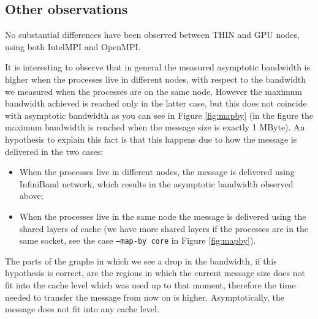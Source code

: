 \documentclass{article}
\begin{document}
\subsection{Other observations}

No substantial differences have been observed between THIN and GPU nodes, using both IntelMPI and OpenMPI.

It is interesting to observe that in general the measured asymptotic bandwidth is higher when the processes live in different nodes, with respect to the bandwidth we measured when the processes are on the same node. However the maximum bandwidth achieved is reached only in the latter case, but this does not coincide with asymptotic bandwidth as you can see in Figure \ref{fig:mapby} (in the figure the maximum bandwidth is reached when the message size is exactly 1 MByte). An hypothesis to explain this fact is that this happens due to how the message is delivered in the two cases:
\begin{itemize}
    \item When the processes live in different nodes, the message is delivered using InfiniBand network, which results in the asymptotic bandwidth observed above;
    \item When the processes live in the same node the message is delivered using the shared layers of cache (we have more shared layers if the processes are in the same socket, see the case \texttt{--map-by core} in Figure \ref{fig:mapby}).
\end{itemize}
The parts of the graphs in which we see a drop in the bandwidth, if this hypothesis is correct, are the regions in which the current message size does not fit into the cache level which was used up to that moment, therefore the time needed to transfer the message from now on is higher. Asymptotically, the message does not fit into any cache level.

\newpage
\end{document}
